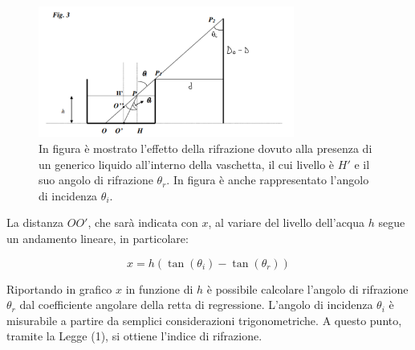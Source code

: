 \begin{figure}[H]
	\centering
	\includegraphics[width=0.75\textwidth]{./figures/Im3}
	\caption{In figura è mostrato l'effetto della rifrazione dovuto alla presenza di un generico liquido all'interno della vaschetta, il cui livello è $H'$ e il suo angolo di rifrazione $\theta_r$. In figura è anche rappresentato l'angolo di incidenza $\theta_i$.}
\end{figure}

La distanza $OO'$, che sarà indicata con $x$, al variare del livello dell'acqua $h$ segue un andamento lineare, in particolare: 

\begin{equation}
	x=h(\tan(\theta_i)-\tan(\theta_r))
\end{equation}

Riportando in grafico $x$ in funzione di $h$ è possibile calcolare l'angolo di rifrazione $\theta_r$ dal coefficiente angolare della retta di regressione. L'angolo di incidenza $\theta_i$ è misurabile a partire da semplici considerazioni trigonometriche. A questo punto, tramite la Legge (1), si ottiene l'indice di rifrazione.

